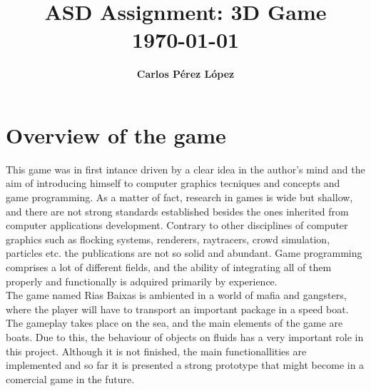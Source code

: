 \documentclass[]{article}
\title{
\vspace{2in}
\textmd{\textbf{ASD Assignment: 3D Game}}\\
\vspace{0.1in}
{\today}\\
\vspace{3in}
}
\author{\textbf{Carlos Pérez López}}
\date{}
\begin{document}
\maketitle %


\setlength\parindent{24pt} %

\renewcommand{\labelenumi}{\alph{enumi}.} %
\renewcommand{\cftsecleader}{\cftdotfill{\cftdotsep}}

\newpage
\tableofcontents
\newpage



\section{Overview of the game}

This game was in first intance driven by a clear idea in the author's mind and the aim of introducing himself to computer graphics tecniques and concepts and game programming. As a matter of fact,
research in games is wide but shallow, and there are not strong standards established besides the ones inherited from computer applications development. Contrary to other disciplines of computer
graphics such as flocking systems, renderers, raytracers, crowd simulation, particles etc. the publications are not so solid and abundant. Game programming comprises a lot of different fields, and
the ability of integrating all of them properly and functionally is adquired primarily by experience.\\

The game named Rias Baixas is ambiented in a world of mafia and gangsters, where the player will have to transport an important package in a speed boat. The gameplay takes place on the sea, and the main
elements of the game are boats. Due to this, the behaviour of objects on fluids has a very important role in this project. Although it is not finished, the main functionallities are implemented and
so far it is presented a strong prototype that might become in a comercial game in the future.\\
\end{document}
